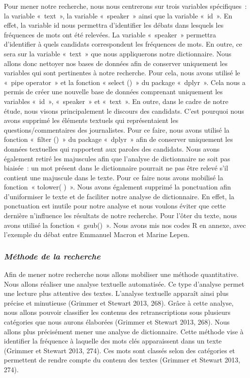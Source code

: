 \documentclass[
  letterpaper,
  DIV=11,
  numbers=noendperiod]{scrartcl}
\begin{document}
Pour mener notre recherche, nous nous centrerons sur trois variables
spécifiques~: la variable «~text~», la variable «~speaker~» ainsi que la
variable «~id~». En effet, la variable id nous permettra d'identifier
les débats dans lesquels les fréquences de mots ont été relevées. La
variable «~speaker~» permettra d'identifier à quels candidats
correspondent les fréquences de mots. En outre, ce sera sur la variable
«~text~» que nous appliquerons notre dictionnaire. Nous allons donc
nettoyer nos bases de données afin de conserver uniquement les variables
qui sont pertinentes à notre recherche. Pour cela, nous avons utilisé le
«~pipe operator~» et la fonction « select ()~» du package «~dplyr~».
Cela nous a permis de créer une nouvelle base de données comprenant
uniquement les variables «~id~», «~speaker~» et «~text~». En outre, dans
le cadre de notre étude, nous visons principalement le discours des
candidats. C'est pourquoi nous avons supprimé les éléments textuels qui
représentaient les questions/commentaires des journalistes. Pour ce
faire, nous avons utilisé la fonction «~filter ()~» du package «~dplyr~»
afin de conserver uniquement les données textuelles qui rapportent aux
paroles des candidats. Nous avons également retiré les majuscules afin
que l'analyse de dictionnaire ne soit pas biaisée~: un mot présent dans
le dictionnaire pourrait ne pas être relevé s'il contient une majuscule
dans le texte. Pour ce faire nous avons mobilisé la fonction~« tolower(
)~». Nous avons également supprimé la ponctuation afin d'uniformiser le
texte et de faciliter notre analyse de dictionnaire. En effet, la
ponctuation est inutile pour notre analyse et nous voulons éviter que
cette dernière n'influence les résultats de notre recherche. Pour l'ôter
du texte, nous avons utilisé la fonction «~gsub()~». Nous avons mis nos
codes R en annexe, avec l'exemple du débat entre Emmanuel Macron et
Marine Lepen.

\hypertarget{muxe9thode-de-la-recherche}{%
\subsubsection{\texorpdfstring{\textbf{\emph{Méthode de la
recherche}}}{Méthode de la recherche}}\label{muxe9thode-de-la-recherche}}

Afin de mener notre recherche nous allons mobiliser une méthode
quantitative. Nous allons réaliser une analyse textuelle automatisée. Ce
type d'analyse permet une lecture plus attentive des textes. L'analyse
textuelle apparaît ainsi plus précise et minutieuse (Grimmer et Stewart
2013, 268). Grâce à cette analyse, nous allons pouvoir classifier les
contenus des retranscriptions sous plusieurs catégories que nous aurons
élaborées (Grimmer et Stewart 2013, 268). Nous allons plus précisément
mener une analyse de dictionnaire. Cette méthode vise à identifier la
fréquence à laquelle des mots clés apparaissent dans un texte (Grimmer
et Stewart 2013, 274). Ces mots sont classés selon des catégories et
permettent de rendre compte du contenu des textes (Grimmer et Stewart
2013, 274).
\end{document}
